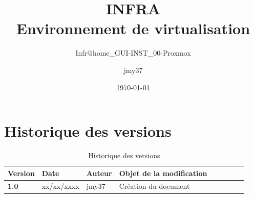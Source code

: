 \documentclass[a4paper, oneside, 12pt, final, headsepline, footsepline]{scrartcl}
\begin{document}
\configHeadersFooters

\title{INFRA \\Environnement de virtualisation} %
\subtitle{Infr@home\_GUI-INST\_00-Proxmox}
\author{jmy37}
\date{\today}

\maketitlepage

\section{Historique des versions}
\begin{table}[H]
    \centering
    \begin{tabular}{|>{\centering\arraybackslash}p{0.09\linewidth}|>{\centering\arraybackslash}p{0.12\linewidth}|>{\raggedright\arraybackslash}p{0.12\linewidth}|>{\raggedright\arraybackslash}p{0.6\linewidth}|}
        \hline
        \textbf{Version} & \textbf{Date} & \textbf{Auteur} & \textbf{Objet de la modification}                                              \\ \hline
        \textbf{1.0}     & xx/xx/xxxx    & jmy37           & Création du document                                                           \\ \hline
    \end{tabular}
    \caption{Historique des versions}
    \label{tab:versioning}
\end{table}

\newpage
\tableofcontents
\newpage


\newpage

\newpage

\newpage
% 
\end{document}
